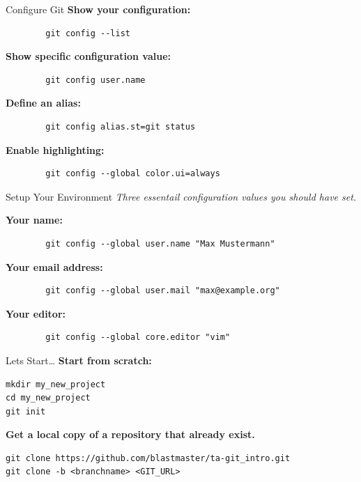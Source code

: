 \begin{frame}[fragile]{Configure Git}
    \textbf{Show your configuration:}
    \begin{lstlisting}
        git config --list
    \end{lstlisting}
    \textbf{Show specific configuration value:}
    \begin{lstlisting}
        git config user.name
    \end{lstlisting}
    \textbf{Define an alias:}
    \begin{lstlisting}
        git config alias.st=git status
    \end{lstlisting}
    \textbf{Enable highlighting:}
    \begin{lstlisting}
        git config --global color.ui=always
    \end{lstlisting}
\end{frame}

\begin{frame}[fragile]{Setup Your Environment}
    \emph{Three essentail configuration values you should have set.}
    \vspace{1cm}

    \textbf{Your name:}
    \begin{lstlisting}
        git config --global user.name "Max Mustermann"
    \end{lstlisting}
    \textbf{Your email address:}
    \begin{lstlisting}
        git config --global user.mail "max@example.org"
    \end{lstlisting}
    \textbf{Your editor:}
    \begin{lstlisting}
        git config --global core.editor "vim"
    \end{lstlisting}
\end{frame}

\begin{frame}[fragile]{Lets Start\ldots}
    \textbf{Start from scratch:}
    \begin{lstlisting}
mkdir my_new_project
cd my_new_project
git init
    \end{lstlisting}
    \textbf{Get a local copy of a repository that already exist.}
    \begin{lstlisting}
git clone https://github.com/blastmaster/ta-git_intro.git
git clone -b <branchname> <GIT_URL>
    \end{lstlisting}
\end{frame}

